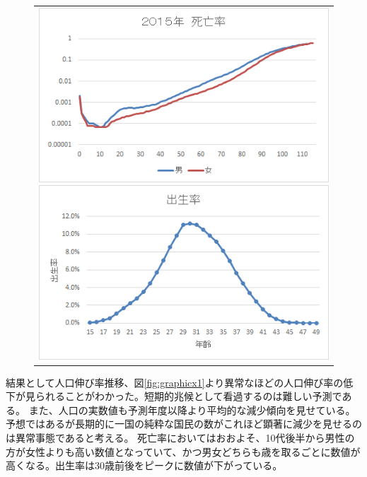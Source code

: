 \documentclass[uplatex, titlepage]{jsarticle}
\begin{document}
\begin{figure}[H]
  \centering
    \begin{tabular}{c}
      \begin{minipage}{0.5\hsize}
        \begin{center}
          \includegraphics[scale=0.9]{./fffff/ffffff/f8.png}
          \caption{}
          \label{fig:graphicx2}
        \end{center}
      \end{minipage}
      \begin{minipage}{0.5\hsize}
        \begin{center}
          \includegraphics[scale = 0.9]{./fffff/ffffff/f9.png}
          \caption{}
          \label{fig:graphicx3}
        \end{center}
      \end{minipage}
    \end{tabular}
\end{figure}

  結果として人口伸び率推移、図\ref{fig:graphicx1}より異常なほどの人口伸び率の低下が見られることがわかった。短期的兆候として看過するのは難しい予測である。
また、人口の実数値も予測年度以降より平均的な減少傾向を見せている。予想ではあるが長期的に一国の純粋な国民の数がこれほど顕著に減少を見せるのは異常事態であると考える。
死亡率においてはおおよそ、10代後半から男性の方が女性よりも高い数値となっていて、かつ男女どちらも歳を取るごとに数値が高くなる。出生率は30歳前後をピークに数値が下がっている。
\end{document}
